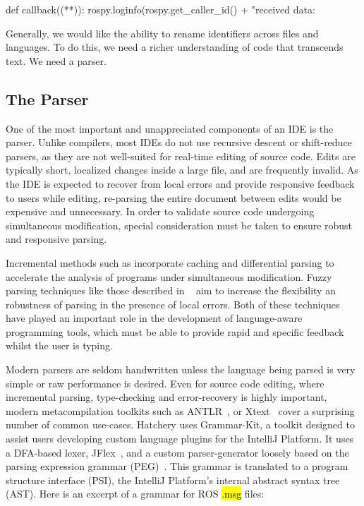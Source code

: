 \documentclass[12pt,initial,twoside,maitrise]{dms}
\newcommand{\inline}[1]{%
\begingroup%
\sethlcolor{slightgray}%
\hl{\ttfamily\small #1}%
\endgroup
}
\numberwithin{equation}{section}
\numberwithin{table}{chapter}
\numberwithin{figure}{chapter}
\begin{document}
\begin{pythonlisting}
def callback((**)):
    rospy.loginfo(rospy.get_caller_id() + "received data: %
\end{pythonlisting}
%
Generally, we would like the ability to rename identifiers across files and languages. To do this, we need a richer understanding of code that transcends text. We need a parser.

\subsection{The Parser}\label{subsec:the-parser}

One of the most important and unappreciated components of an IDE is the parser. Unlike compilers, most IDEs do not use recursive descent or shift-reduce parsers, as they are not well-suited for real-time editing of source code. Edits are typically short, localized changes inside a large file, and are frequently invalid. As the IDE is expected to recover from local errors and provide responsive feedback to users while editing, re-parsing the entire document between edits would be expensive and unnecessary. In order to validate source code undergoing simultaneous modification, special consideration must be taken to ensure robust and responsive parsing.

Incremental methods such as \citet{wagner1997practical,wagner1997incremental} incorporate caching and differential parsing to accelerate the analysis of programs under simultaneous modification. Fuzzy parsing techniques like those described in ~\citet{koppler1997systematic} aim to increase the flexibility an robustness of parsing in the presence of local errors. Both of these techniques have played an important role in the development of language-aware programming tools, which must be able to provide rapid and specific feedback whilst the user is typing.

Modern parsers are seldom handwritten unless the language being parsed is very simple or raw performance is desired. Even for source code editing, where incremental parsing, type-checking and error-recovery is highly important, modern metacompilation toolkits such as ANTLR~\citep{parr1995antlr}, or Xtext~\citep{eysholdt2010xtext} cover a surprising number of common use-cases. Hatchery uses Grammar-Kit, a toolkit designed to assist users developing custom language plugins for the IntelliJ Platform. It uses a DFA-based lexer, JFlex~\citep{klein2001jflex}, and a custom parser-generator loosely based on the parsing expression grammar (PEG)~\citep{ford2004parsing}. This grammar is translated to a program structure interface (PSI), the IntelliJ Platform's internal abstract syntax tree (AST). Here is an excerpt of a grammar for ROS \inline{.msg} files:
\end{document}
